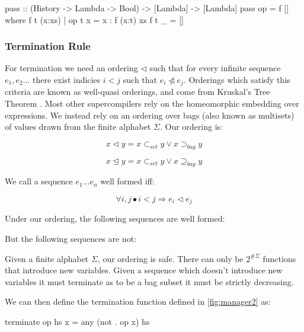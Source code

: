 \documentclass[draft]{sigplanconf}
\begin{document}
\begin{code}
pass  :: (History -> Lambda -> Bool)
      -> [Lambda] -> [Lambda]
pass op = f []
    where f t (x:xs) | op t x = x : f (x:t) xs
          f t _ = []
\end{code}

\subsubsection{Termination Rule}

For termination we need an ordering $\lhd$ such that for every infinite sequence $e_1,e_2 \ldots$ there exist indicies $i < j$ such that $e_i \ntriangleleft e_j$. Orderings which satisfy this criteria are known as well-quasi orderings, and come from Kruskal's Tree Theorem \cite{kruskal:tree}. Most other supercompilers rely on the homeomorphic embedding \cite{leuschel:homeomorphic} over expressions. We instead rely on an ordering over bags (also known as multisets) of values drawn from the finite alphabet $\Sigma$. Our ordering is:

\[
x \lhd y = x \subset_{set} y \vee x \supset_{bag} y
\]

\[
x \unlhd y = x \subset_{set} y \vee x \supseteq_{bag} y
\]

We call a sequence $e_1 \ldots e_n$ well formed iff:

\[
\forall i,j \bullet i < j \Rightarrow e_i \lhd e_j
\]

Under our ordering, the following sequences are well formed:

\begin{code}
\end{code}

But the following sequences are not:

\begin{code}
\end{code}

Given a finite alphabet $\Sigma$, our ordering is safe. There can only be $2^{\#\Sigma}$ functions that introduce new variables. Given a sequence which doesn't introduce new variables it must terminate as to be a bag subset it must be strictly decreasing.

We can then define the termination function defined in \ref{fig:manager2} as:

\begin{code}
terminate op hs x = any (not . op x) hs
\end{code}
\end{document}
